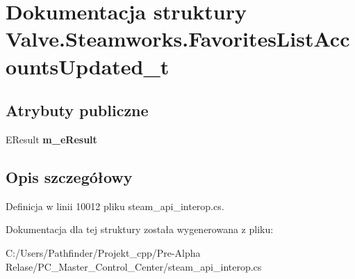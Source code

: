 \hypertarget{struct_valve_1_1_steamworks_1_1_favorites_list_accounts_updated__t}{}\section{Dokumentacja struktury Valve.\+Steamworks.\+Favorites\+List\+Accounts\+Updated\+\_\+t}
\label{struct_valve_1_1_steamworks_1_1_favorites_list_accounts_updated__t}
\subsection*{Atrybuty publiczne}
\begin{DoxyCompactItemize}
\item 
\mbox{\label{struct_valve_1_1_steamworks_1_1_favorites_list_accounts_updated__t_a300ccbb060f1ebe1b005e12c96bc0436}} 
E\+Result {\bfseries m\+\_\+e\+Result}
\end{DoxyCompactItemize}


\subsection{Opis szczegółowy}


Definicja w linii 10012 pliku steam\+\_\+api\+\_\+interop.\+cs.



Dokumentacja dla tej struktury została wygenerowana z pliku\+:\begin{DoxyCompactItemize}
\item 
C\+:/\+Users/\+Pathfinder/\+Projekt\+\_\+cpp/\+Pre-\/\+Alpha Relase/\+P\+C\+\_\+\+Master\+\_\+\+Control\+\_\+\+Center/steam\+\_\+api\+\_\+interop.\+cs\end{DoxyCompactItemize}
